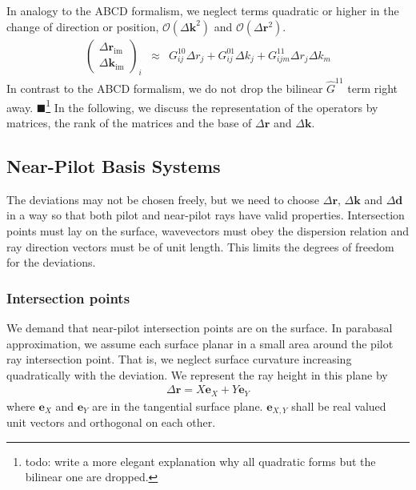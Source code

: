 \documentclass[12pt,a4paper,twoside,openright,BCOR10mm,headsepline,titlepage,abstracton,chapterprefix,final]{scrreprt}
\newcommand\Vector[1]{{\mathbf{#1}}}
\newcommand\wavenumber{k}
\newcommand\Wavevector{\Vector{\wavenumber}}
\newcommand{\remark}[1]{{\color{red}$\blacksquare$}\footnote{{\color{red}#1}}}
\newcommand{\orderof}[1]{\mathcal{O}(#1)}
\newcommand\im{\textrm{im}}
\begin{document}
In analogy to the ABCD formalism, we neglect terms quadratic or higher in the change of direction or position, 
$\orderof{\Delta\Wavevector^2}$ and $\orderof{\Delta\Vector{r}^2}$.
\begin{eqnarray}
 \begin{pmatrix}
  \Delta \Vector{r}_\im \\ \Delta \Wavevector_\im
 \end{pmatrix}_i
 &\approx&
   G^{10}_{ij} \Delta r_j
 + G^{01}_{ij} \Delta k_j
 + G^{11}_{ijm} \Delta r_j \Delta k_m
\end{eqnarray}
In contrast to the ABCD formalism, we do not drop the bilinear $\hat{G}^{11}$ term right away.
\remark{todo: write a more elegant explanation why all quadratic forms but the bilinear one are dropped.}
In the following, we discuss the representation of the operators by matrices, 
the rank of the matrices and the base of $\Delta \Vector{r}$ and $\Delta \Wavevector$.

\subsection{Near-Pilot Basis Systems}

The deviations may not be chosen freely, but we need to choose
$\Delta\Vector{r}$, $\Delta\Wavevector$ and $\Delta\Vector{d}$ 
in a way so that both pilot and near-pilot rays
have valid properties.
Intersection points must lay on the surface,
wavevectors must obey the dispersion relation 
and ray direction vectors must be of unit length.
This limits the degrees of freedom for the deviations.

\subsubsection{Intersection points}

We demand that near-pilot intersection points are on the surface.
In parabasal approximation, we assume each surface planar in a small area around the pilot ray intersection point.
That is, we neglect surface curvature increasing quadratically with the deviation. 
We represent the ray height in this plane by
\begin{eqnarray}
 \Delta\Vector{r} = X \Vector{e}_{X} + Y \Vector{e}_{Y}
 \label{eq:deltaR_equals_XY}
\end{eqnarray}
where $\Vector{e}_{X}$ and $\Vector{e}_{Y}$ are in the tangential surface plane.
$\Vector{e}_{X,Y}$ shall be real valued unit vectors and orthogonal on each other.
\end{document}
